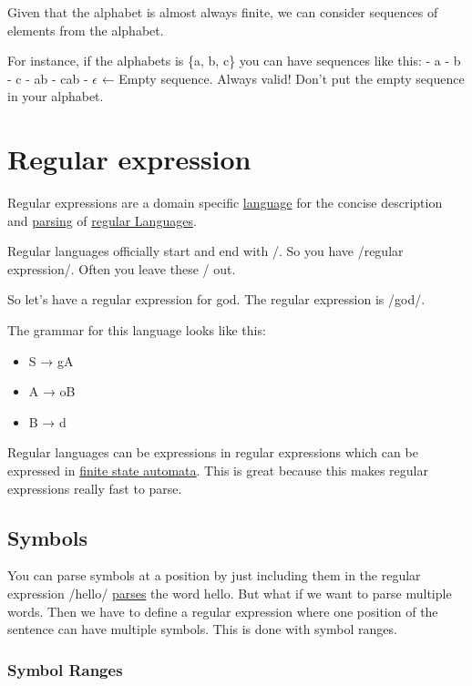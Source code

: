 \documentclass[
  11pt,
  british,
]{article}
\providecommand{\tightlist}{%
  \setlength{\itemsep}{0pt}\setlength{\parskip}{0pt}}
\begin{document}
Given that the alphabet is almost always finite, we can consider
sequences of elements from the alphabet.

For instance, if the alphabets is \{a, b, c\} you can have sequences
like this: - a - b - c - ab - cab - \(\epsilon\) ← Empty sequence.
Always valid! Don't put the empty sequence in your alphabet.

\hypertarget{regular-expression}{%
\section{Regular expression}\label{regular-expression}}

Regular expressions are a domain specific
\href{Languages/Languages.md}{language} for the concise description and
\href{Parsing.md}{parsing} of \href{Regular\%20Languages.md}{regular
Languages}.

Regular languages officially start and end with /. So you have /regular
expression/. Often you leave these / out.

So let's have a regular expression for god. The regular expression is
/god/.

The grammar for this language looks like this:

\begin{itemize}
\tightlist
\item
  S → gA
\item
  A → oB
\item
  B → d
\end{itemize}

Regular languages can be expressions in regular expressions which can be
expressed in \href{finite\%20state\%20automata.md}{finite state
automata}. This is great because this makes regular expressions really
fast to parse.

\hypertarget{symbols-1}{%
\subsection{Symbols}\label{symbols-1}}

You can parse symbols at a position by just including them in the
regular expression /hello/ \href{Parsing.md}{parses} the word hello. But
what if we want to parse multiple words. Then we have to define a
regular expression where one position of the sentence can have multiple
symbols. This is done with symbol ranges.

\hypertarget{symbol-ranges}{%
\subsubsection{Symbol Ranges}\label{symbol-ranges}}
\end{document}
